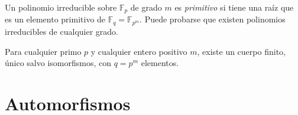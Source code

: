 Un polinomio irreducible sobre \(\mathbb F_p\) de grado \(m\) es \textit{primitivo} si tiene una raíz que es un elemento primitivo de \(\mathbb F_q = \mathbb F_{p^m}\).
Puede probarse que existen polinomios irreducibles de cualquier grado.

\begin{theorem}
  Para cualquier primo \(p\) y cualquier entero positivo \(m\), existe un cuerpo finito, único salvo isomorfismos, con \(q = p^m\) elementos.
\end{theorem}



\section{Automorfismos}





